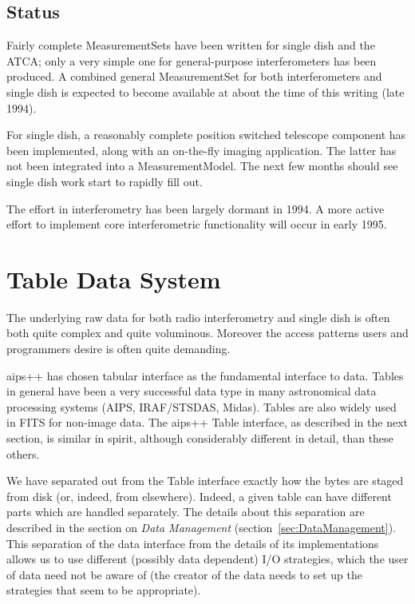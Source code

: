 \subsection{Status}

Fairly complete MeasurementSets have been written for single dish and
the ATCA; only a very simple one for general-purpose interferometers
has been produced. A combined general MeasurementSet for both
interferometers and single dish is expected to become available at
about the time of this writing (late 1994).

For single dish, a reasonably complete position switched telescope
component has been implemented, along with an on-the-fly imaging
application. The latter has not been integrated into a
MeasurementModel. The next few months should see single dish work
start to rapidly fill out.

The effort in interferometry has been largely dormant in 1994.  A more
active effort to implement core interferometric functionality will
occur in early 1995.

\section{Table Data System}
\label{sec:TableDataSystem}

The underlying raw data for both radio interferometry and single dish
is often both quite complex and quite voluminous. Moreover the access
patterns users and programmers desire is often quite demanding.

{\sc aips++} has chosen tabular interface as the fundamental interface
to data. Tables in general have been a very successful data type in
many astronomical data processing systems (AIPS, IRAF/STSDAS,
Midas). Tables are also widely used in FITS for non-image data. The
{\sc aips++} Table interface, as described in the next section, is
similar in spirit, although considerably different in detail, than
these others.

We have separated out from the Table interface exactly how the bytes
are staged from disk (or, indeed, from elsewhere). Indeed, a given
table can have different parts which are handled separately. The
details about this separation are described in the section on {\em
Data Management} (section~\ref{sec:DataManagement}). This separation
of the data interface from the details of its implementations allows
us to use different (possibly data dependent) I/O strategies, which
the user of data need not be aware of (the creator of the data needs
to set up the strategies that seem to be appropriate).


